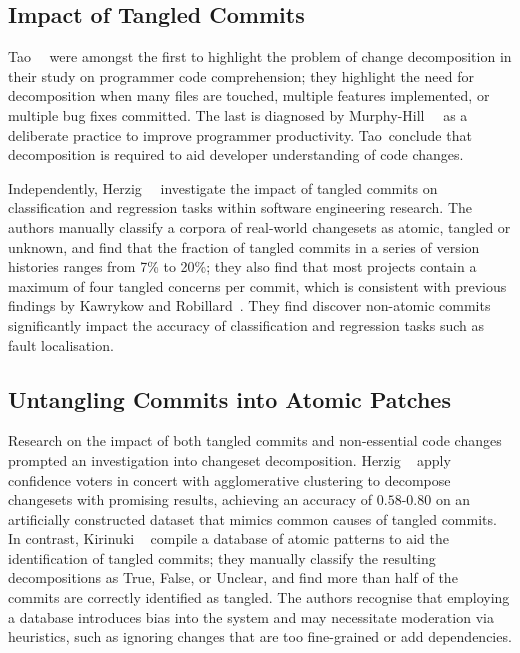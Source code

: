 \subsection{Impact of Tangled Commits}
\label{chapter:literature:sec:flexeme_rel_work:impact}

Tao~\etal~\cite{Tao2012} were amongst the first to highlight the problem of
change decomposition in their study on programmer code comprehension; they
highlight the need for decomposition when many files are touched, multiple
features implemented, or multiple bug fixes committed. The last is diagnosed by
Murphy-Hill~\etal~\cite{Murphy-Hill2012} as a deliberate practice to improve
programmer productivity. Tao~\etal conclude that decomposition is required to
aid developer understanding of code changes.

Independently, Herzig~\etal~\cite{Herzig2013, Herzig2016} investigate the impact
of tangled commits on classification and regression tasks within software
engineering research. The authors manually classify a corpora of real-world
changesets as atomic, tangled or unknown, and find that the fraction of tangled
commits in a series of version histories ranges from 7\% to 20\%; they also find
that most projects contain a maximum of four tangled concerns per commit, which
is  consistent with previous findings by Kawrykow and
Robillard~\cite{Kawrykow2011}. They find discover non-atomic commits
significantly impact the accuracy of classification and regression tasks such as
fault localisation. 

\subsection{Untangling Commits into Atomic Patches}
\label{chapter:literature:sec:flexeme_rel_work:untangle}

Research on the impact of both tangled commits and non-essential code changes
prompted an investigation into changeset decomposition. Herzig
\etal~\cite{Herzig2013, Herzig2016} apply confidence voters in concert with
agglomerative clustering to decompose changesets with promising results,
achieving an accuracy of $0.58$-$0.80$ on an artificially constructed dataset
that mimics common causes of tangled commits. In contrast, Kirinuki
\etal~\cite{Kirinuki2014, Kirinuki2017} compile a database of atomic patterns to
aid the identification of tangled commits; they manually classify the resulting
decompositions as True, False, or Unclear, and find more than half of the
commits are correctly identified as tangled. The authors recognise that
employing a database introduces bias into the system and may necessitate
moderation via heuristics, such as ignoring changes that are too fine-grained or
add dependencies.

